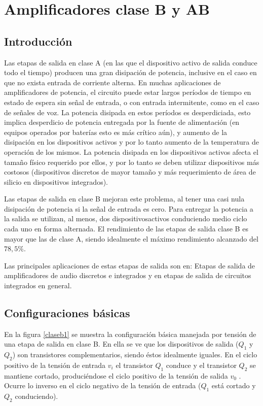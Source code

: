 \chapter{Amplificadores clase B y AB}


\section{Introducción}

\hspace{10pt} Las etapas de salida en clase A (en las que el dispositivo activo de
salida conduce todo el tiempo) producen una gran disipación de
potencia, inclusive en el caso en que no exista entrada de corriente
alterna. En muchas aplicaciones de amplificadores de potencia, el
circuito puede estar largos períodos de tiempo en estado de espera
sin señal de entrada, o con entrada intermitente, como en el caso de
señales de voz. La potencia disipada en estos períodos es
desperdiciada, esto implica desperdicio de potencia entregada por la
fuente de alimentación (en equipos operados por baterías esto es más
crítico aún), y aumento de la disipación en los dispositivos activos
y por lo tanto aumento de la temperatura de operación de los mismos.
La potencia disipada en los dispositivos activos afecta el tamaño
físico requerido por ellos, y por lo tanto se deben utilizar
dispositivos más costosos (dispositivos discretos de mayor tamaño y
más requerimiento de área de silicio en dispositivos integrados).

Las etapas de salida en clase B mejoran este problema, al tener una
casi nula disipación de potencia si la señal de entrada es cero.
Para entregar la potencia a la salida se utilizan, al menos, dos dispositivosactivos conduciendo medio ciclo cada uno en forma alternada. El
rendimiento de las etapas de salida clase B es mayor que las de
clase A, siendo idealmente el máximo rendimiento alcanzado del $78,5
\%$.

Las principales aplicaciones de estas etapas de salida son en:
Etapas de salida de amplificadores de audio discretos e integrados y
en etapas de salida de circuitos integrados en general.


\section{Configuraciones básicas}

\hspace{10pt}  En la figura \ref{claseb1} se muestra la configuración básica
manejada por tensión de una etapa de salida en clase B. En ella se
ve que los dispositivos de salida ($Q_1$ y $Q_2$)  son transistores
complementarios, siendo éstos idealmente iguales. En el ciclo
positivo de la tensión de entrada $v_i$ el transistor $Q_1$ conduce
y el transistor $Q_2$ se mantiene cortado, produciéndose el ciclo
positivo de la tensión de salida $v_0$ . Ocurre lo inverso en el
ciclo negativo de la tensión de entrada ($Q_1$ está cortado y $Q_2$
conduciendo).

